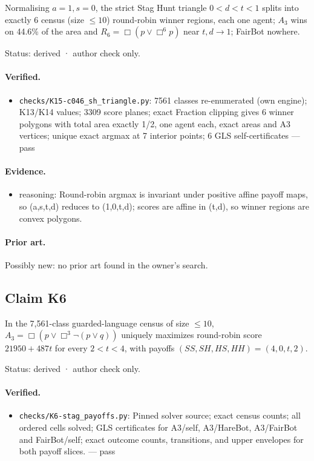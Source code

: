 \documentclass{article}
\begin{document}
Normalising $a=1,s=0$, the strict Stag Hunt triangle $0<d<t<1$ splits into exactly 6 census (size $\le10$) round-robin winner regions, each one agent; $A_3$ wins on 44.6\% of the area and $R_6=\Box(p\lor\Box^6p)$ near $t,d\to1$; FairBot nowhere.

Status: derived · author check only.

\paragraph{Verified.}
\begin{itemize}
\item \texttt{checks/K15-c046\_sh\_triangle.py}: 7561 classes re-enumerated (own engine); K13/K14 values; 3309 score planes; exact Fraction clipping gives 6 winner polygons with total area exactly 1/2, one agent each, exact areas and A3 vertices; unique exact argmax at 7 interior points; 6 GLS self-certificates --- pass
\end{itemize}

\paragraph{Evidence.}
\begin{itemize}
\item reasoning: Round-robin argmax is invariant under positive affine payoff maps, so (a,s,t,d) reduces to (1,0,t,d); scores are affine in (t,d), so winner regions are convex polygons.
\end{itemize}

\paragraph{Prior art.} Possibly new: no prior art found in the owner's search.

\subsection*{Claim K6}

In the 7,561-class guarded-language census of size $\le10$, $A_3=\Box(p\lor\Box^3\neg(p\lor q))$ uniquely maximizes round-robin score $21950+487t$ for every $2<t<4$, with payoffs $(SS,SH,HS,HH)=(4,0,t,2)$.

Status: derived · author check only.

\paragraph{Verified.}
\begin{itemize}
\item \texttt{checks/K6-stag\_payoffs.py}: Pinned solver source; exact census counts; all ordered cells solved; GLS certificates for A3/self, A3/HareBot, A3/FairBot and FairBot/self; exact outcome counts, transitions, and upper envelopes for both payoff slices. --- pass
\end{itemize}
\end{document}

